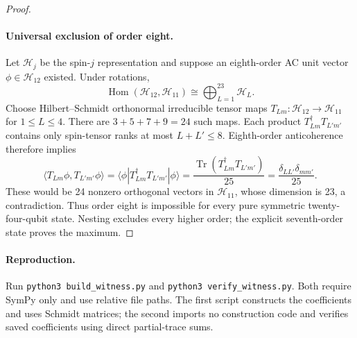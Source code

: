 \documentclass[11pt]{article}
\newcommand{\Tr}{\operatorname{Tr}}
\begin{document}
\begin{proof}
\paragraph{Universal exclusion of order eight.}
Let $\mathcal H_j$ be the spin-$j$ representation and suppose an eighth-order
AC unit vector $\phi\in\mathcal H_{12}$ existed.
Under rotations,
\[
\operatorname{Hom}(\mathcal H_{12},\mathcal H_{11})
\cong\bigoplus_{L=1}^{23}\mathcal H_L.
\]
Choose Hilbert--Schmidt orthonormal irreducible tensor maps
$T_{Lm}:\mathcal H_{12}\to\mathcal H_{11}$ for $1\le L\le4$.
There are $3+5+7+9=24$ such maps.
Each product $T_{Lm}^\dagger T_{L'm'}$ contains only spin-tensor ranks at most
$L+L'\le8$. Eighth-order anticoherence therefore implies
\[
\langle T_{Lm}\phi,T_{L'm'}\phi\rangle
=\langle\phi|T_{Lm}^\dagger T_{L'm'}|\phi\rangle
=\frac{\Tr(T_{Lm}^\dagger T_{L'm'})}{25}
=\frac{\delta_{LL'}\delta_{mm'}}{25}.
\]
These would be 24 nonzero orthogonal vectors in $\mathcal H_{11}$, whose
dimension is 23, a contradiction. Thus order eight is impossible for every
pure symmetric twenty-four-qubit state. Nesting excludes every higher order;
the explicit seventh-order state proves the maximum.
\end{proof}
\paragraph{Reproduction.}
Run \texttt{python3 build\_witness.py} and \texttt{python3 verify\_witness.py}.
Both require SymPy only and use relative file paths. The first script constructs
the coefficients and uses Schmidt matrices; the second imports no construction
code and verifies saved coefficients using direct partial-trace sums.
\end{document}

